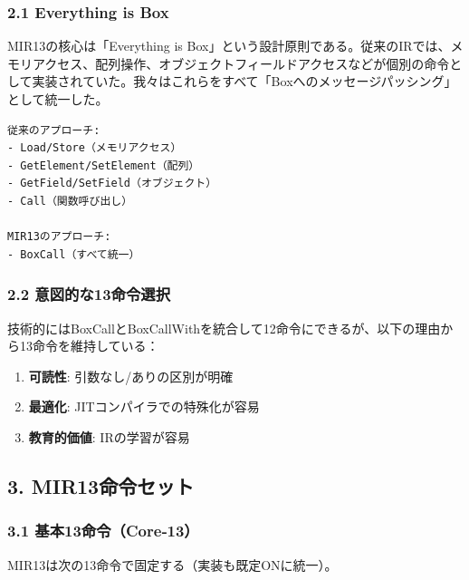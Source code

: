 \documentclass[
]{article}
\providecommand{\tightlist}{%
  \setlength{\itemsep}{0pt}\setlength{\parskip}{0pt}}
\begin{document}
\hypertarget{everything-is-box}{%
\subsubsection{2.1 Everything is Box}\label{everything-is-box}}

MIR13の核心は「Everything is
Box」という設計原則である。従来のIRでは、メモリアクセス、配列操作、オブジェクトフィールドアクセスなどが個別の命令として実装されていた。我々はこれらをすべて「Boxへのメッセージパッシング」として統一した。

\begin{verbatim}
従来のアプローチ:
- Load/Store（メモリアクセス）
- GetElement/SetElement（配列）  
- GetField/SetField（オブジェクト）
- Call（関数呼び出し）

MIR13のアプローチ:
- BoxCall（すべて統一）
\end{verbatim}

\hypertarget{ux610fux56f3ux7684ux306a13ux547dux4ee4ux9078ux629e}{%
\subsubsection{2.2
意図的な13命令選択}\label{ux610fux56f3ux7684ux306a13ux547dux4ee4ux9078ux629e}}

技術的にはBoxCallとBoxCallWithを統合して12命令にできるが、以下の理由から13命令を維持している：

\begin{enumerate}
\def\labelenumi{\arabic{enumi}.}
\tightlist
\item
  \textbf{可読性}: 引数なし/ありの区別が明確
\item
  \textbf{最適化}: JITコンパイラでの特殊化が容易
\item
  \textbf{教育的価値}: IRの学習が容易
\end{enumerate}

\hypertarget{mir13ux547dux4ee4ux30bbux30c3ux30c8}{%
\subsection{3.
MIR13命令セット}\label{mir13ux547dux4ee4ux30bbux30c3ux30c8}}

\hypertarget{ux57faux672c13ux547dux4ee4core13}{%
\subsubsection{3.1
基本13命令（Core‑13）}\label{ux57faux672c13ux547dux4ee4core13}}

MIR13は次の13命令で固定する（実装も既定ONに統一）。
\end{document}
